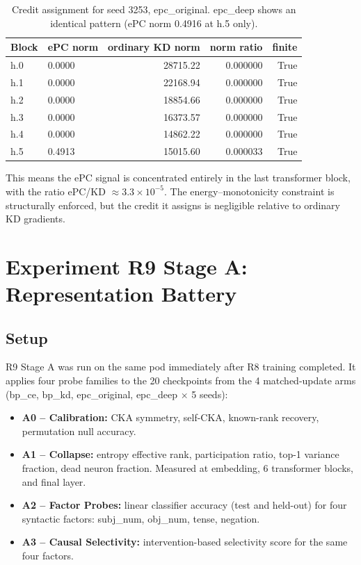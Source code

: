 \documentclass[11pt,a4paper]{article}
\begin{document}
\begin{table}[h]
\centering
\begin{tabular}{llrrr}
\toprule
\textbf{Block} & \textbf{ePC norm} & \textbf{ordinary KD norm} & \textbf{norm ratio} & \textbf{finite} \\
\midrule
h.0 & 0.0000 & 28715.22 & 0.000000 & True \\
h.1 & 0.0000 & 22168.94 & 0.000000 & True \\
h.2 & 0.0000 & 18854.66 & 0.000000 & True \\
h.3 & 0.0000 & 16373.57 & 0.000000 & True \\
h.4 & 0.0000 & 14862.22 & 0.000000 & True \\
h.5 & 0.4913 & 15015.60 & 0.000033 & True \\
\bottomrule
\end{tabular}
\caption{Credit assignment for seed 3253, epc\_original.
  epc\_deep shows an identical pattern (ePC norm 0.4916 at h.5 only).}
\label{tab:credit-assignment}
\end{table}

This means the ePC signal is concentrated entirely in the last
transformer block, with the ratio ePC/KD $\approx 3.3 \times
10^{-5}$.  The energy--monotonicity constraint is structurally
enforced, but the credit it assigns is negligible relative to ordinary
KD gradients.

\section{Experiment R9 Stage A: Representation Battery}

\subsection{Setup}

R9 Stage A was run on the same pod immediately after R8 training
completed.  It applies four probe families to the 20 checkpoints from
the 4 matched-update arms (bp\_ce, bp\_kd, epc\_original, epc\_deep
$\times$ 5 seeds):

\begin{itemize}[nosep]
  \item \textbf{A0 -- Calibration:} CKA symmetry, self-CKA, known-rank
    recovery, permutation null accuracy.
  \item \textbf{A1 -- Collapse:} entropy effective rank, participation
    ratio, top-1 variance fraction, dead neuron fraction.  Measured at
    embedding, 6 transformer blocks, and final layer.
  \item \textbf{A2 -- Factor Probes:} linear classifier accuracy
    (test and held-out) for four syntactic factors: subj\_num,
    obj\_num, tense, negation.
  \item \textbf{A3 -- Causal Selectivity:} intervention-based
    selectivity score for the same four factors.
\end{itemize}
\end{document}

